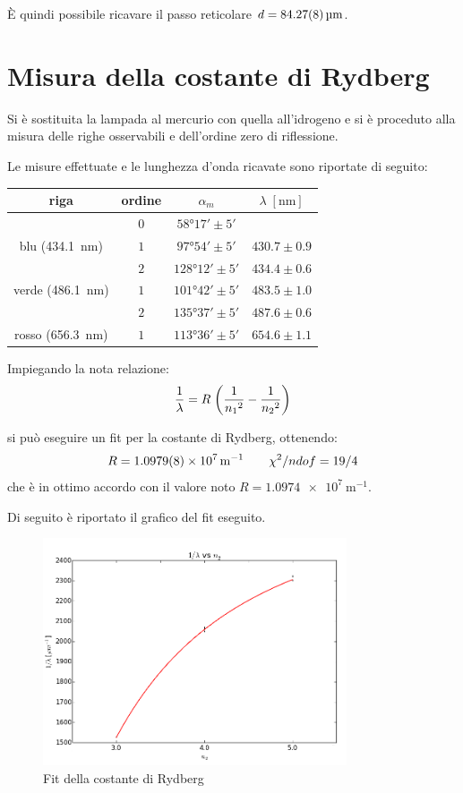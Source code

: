 È quindi possibile ricavare il passo reticolare $d=	\SI{84.27 \pm 0.08}{\micro\meter}$.

\section{Misura della costante di Rydberg}
	Si è sostituita la lampada al mercurio con quella all'idrogeno e si è proceduto alla misura delle righe osservabili e dell'ordine zero di riflessione.
	
	Le misure effettuate e le lunghezza d'onda ricavate sono riportate di seguito:
	\smallskip
	\begin{table}[H]
	\centering
		\begin{tabular}{c|c|c|c}
			riga & ordine & $\alpha _{m}$ & $\lambda \;[\si{\nm}]$ \\
		\hline
		& $ 0 $ &$\ang{58;17;} \pm 5' $ &\\
		\hline
		blu (\SI{434.1}{\nano\meter})& $ 1 $ &$\ang{97;54;} \pm 5' $ & $430.7 \pm 0.9$\\
		\hline
		 & $ 2$ & $\ang{128;12;} \pm 5' $ &$434.4 \pm 0.6$\\
		\hline
		verde (\SI{486.1}{\nano\meter}) & $ 1$ & $\ang{101;42;} \pm 5' $ &$483.5 \pm 1.0$\\
		\hline
		 &$ 2$ & $\ang{135;37;} \pm 5' $&$487.6 \pm 0.6$ \\
		\hline
		rosso (\SI{656.3}{\nano\meter})&$1$ & $\ang{113;36;} \pm 5' $ &$654.6 \pm 1.1$\\
		\end{tabular}
	\end{table}
	\smallskip

	Impiegando la nota relazione:
	\smallskip
	\begin{equation*}\label{eq:ryd}
	\frac{1}{\lambda}=R\;\biggl(\frac{1}{{n_1}^2}-\frac{1}{{n_2}^2}\biggr)
		\smallskip
	\end{equation*}

si può eseguire un fit per la costante di Rydberg, ottenendo:
$$R= \SI{1.0979\pm0.0008e7}{\meter^{-1}} \qquad \chi^2/ndof = 19/4$$ che è in ottimo accordo con il valore noto $R= \SI{1.0974e7}{\meter^{-1}}$. 

Di seguito è riportato il grafico del fit eseguito.

	\begin{figure} [H]
		\centering
		\includegraphics[width=0.8\textwidth]{../FIgs-tabs/fit_R.png}
		\caption{Fit della costante di Rydberg}
	\end{figure}


